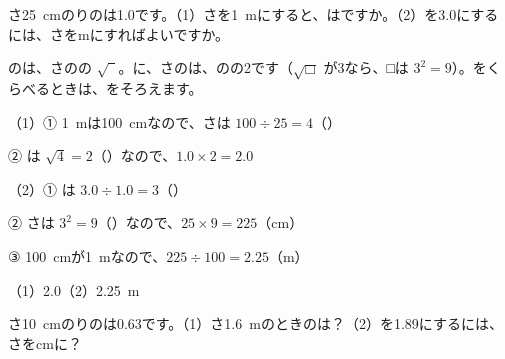 \begin{reidai}[\R{振}{ふ}り\R{子}{こ}の\R{周期}{しゅう|き}]
さ\qty{25}{cm}のりのは1.0です。（1）さを\qty{1}{m}にすると、はですか。（2）を3.0にするには、さをmにすればよいですか。\par
\kangaekata {}のは、さのの $\sqrt{\phantom{2}}$。に、さのは、のの2です（$\sqrt{\text{□}}$ が3なら、□は $3^2=9$）。をくらべるときは、をそろえます。\par
\shiki （1）① \qty{1}{m}は\qty{100}{cm}なので、さは $100\div25=4$（）\par
\hspace*{2.6\zw}\phantom{（1）}② は $\sqrt{4}=2$（）なので、$1.0\times2=2.0$\par
\hspace*{2.6\zw}（2）① は $3.0\div1.0=3$（）\par
\hspace*{2.6\zw}\phantom{（2）}② さは $3^2=9$（）なので、$25\times9=225$（cm）\par
\hspace*{2.6\zw}\phantom{（2）}③ \qty{100}{cm}が\qty{1}{m}なので、$225\div100=2.25$（m）\par
\kotae （1）2.0\quad（2）\qty{2.25}{m}
\end{reidai}

\begin{jibun}
さ\qty{10}{cm}のりのは0.63です。（1）さ\qty{1.6}{m}のときのは？（2）を1.89にするには、さをcmに？
\end{jibun}


